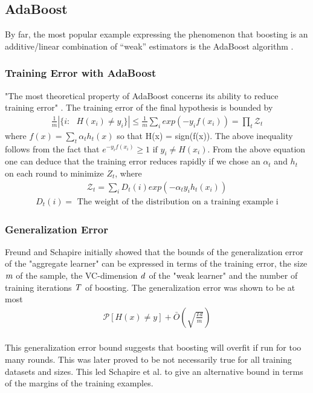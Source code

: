 \documentclass[letterpaper,11pt]{article}
\begin{document}
\subsection {AdaBoost}
By far, the most popular example expressing the phenomenon that boosting is an additive/linear combination of  “weak” estimators is the AdaBoost algorithm \cite{S99}. 

\subsubsection {Training Error with AdaBoost}
"The most theoretical property of AdaBoost concerns its ability to reduce training error"  \cite{S99}. The training error of the final hypothesis is bounded by 
\begin{align}
\frac{1}{m}|\{ i:\text{  } H(x_i) \ne y_i\}| \le \frac{1}{m} \sum_i exp(-y_i f(x_i)) = \prod_t \mathcal Z_t \nonumber
\end{align}
where $f(x) = \sum_t \alpha_t h_t(x)$ so that H(x) = sign(f(x)). The above inequality follows from the fact that $e^{-y_i f(x_i)} \ge 1 \text{  if  } y_i \ne H(x_i)$. From the above equation one can deduce that the training error reduces rapidly if we chose an $\alpha_t$ and $h_t$ on each round to minimize $Z_t$, where \\
\begin{align}
\mathcal Z_t = \sum_i D_t(i) exp (-\alpha_t y_i h_t(x_i)) \nonumber
\end{align}
\begin{align}
D_t(i) = \text{ The weight of the distribution on a training example i} \nonumber
\end{align} 

\subsubsection {Generalization Error}
Freund and Schapire \cite{S99} initially showed that the bounds of the generalization error of the "aggregate learner" can be expressed in terms of the training error, the size $\it m$ of the sample, the VC-dimension $\it d$ of the "weak learner" and the number of training iterations $\it T$ of boosting. The generalization error was shown to be at most 
\begin{align}
\mathcal P[H(x) \ne y] + \bar O(\sqrt{\frac{Td}{m}}) \nonumber
\end{align}
\\
This generalization error bound suggests that boosting will overfit if run for too many rounds. This was later proved to be not necessarily true for all training datasets and sizes. This led Schapire et al. \cite{sfbl98} to give an alternative bound in terms of the margins of the training examples.
\end{document}
